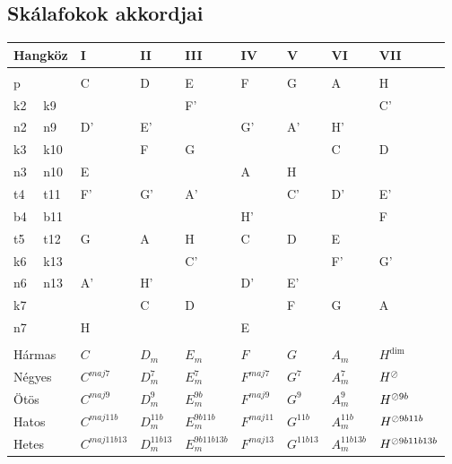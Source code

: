 \subsection{Skálafokok akkordjai}
\label{sec:skalaakkordok}
\begin{tabular}{llp{18mm}p{17mm}p{18mm}p{17mm}p{18mm}p{17mm}p{18mm}}
\multicolumn{2}{l}{Hangköz} & I & II & III & IV & V & VI & VII \\ \hline \\[-2.2ex]
p  &     & C & D & E & F & G & A & H \\
k2 & k9  &   &   & F'&   &   &   & C'\\
n2 & n9  & D'& E'&   & G'& A'& H'&   \\
k3 & k10 &   & F & G &   &   & C & D \\
n3 & n10 & E &   &   & A & H &   &   \\
t4 & t11 & F'& G'& A'&   & C'& D'& E'\\
b4 & b11 &   &   &   & H'&   &   & F \\
t5 & t12 & G & A & H & C & D & E &   \\
k6 & k13 &   &   & C'&   &   & F'& G'\\
n6 & n13 & A'& H'&   & D'& E'&   &   \\
k7 &     &   & C & D &   & F & G & A \\
n7 &     & H &   &   & E &   &   &   \\ \hline \\[-2.2ex]
\multicolumn{2}{l}{Hármas} &
$C$ & $D_m$ & $E_m$ & $F$ & $G$ & $A_m$ & $H^\dim$ \\[0.4ex]
\multicolumn{2}{l}{Négyes} &
$C^{maj7}$ & $D_m^7$ & $E_m^7$ & $F^{maj7}$ & $G^7$ & $A_m^7$ & $H^\oslash$ \\[0.4ex]
\multicolumn{2}{l}{Ötös} &
$C^{maj9}$ & $D_m^9$ & $E_m^{9b}$ & $F^{maj9}$ & $G^9$ & $A_m^9$ & $H^{\oslash9b}$ \\[0.4ex]
\multicolumn{2}{l}{Hatos} &
$C^{maj11b}$ & $D_m^{11b}$ & $E_m^{9b11b}$ & $F^{maj11}$ & $G^{11b}$ & $A_m^{11b}$ &  $H^{\oslash9b11b}$ \\[0.4ex]
\multicolumn{2}{l}{Hetes} &
$C^{maj11b13}$ & $D_m^{11b13}$ & $E_m^{9b11b13b}$ & $F^{maj13}$ & $G^{11b13}$ & $A_m^{11b13b}$ & $H^{\oslash9b11b13b}$ \\
\end{tabular}
\label{fig:durskalahangzatok}~\\\\
